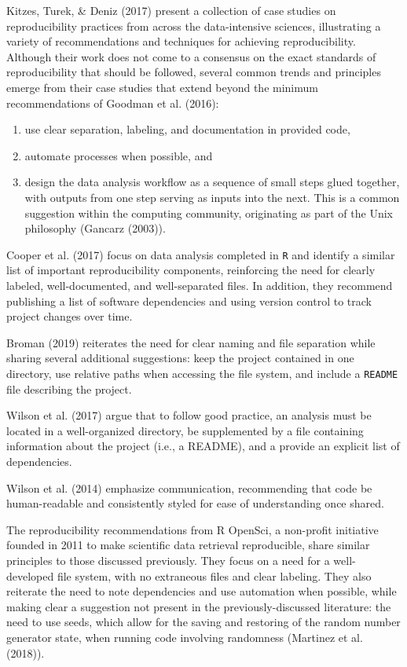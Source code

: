 \documentclass[12pt,twoside]{reedthesis}
\providecommand{\tightlist}{%
  \setlength{\itemsep}{0pt}\setlength{\parskip}{0pt}}
\begin{document}
Kitzes, Turek, \& Deniz (2017) present a collection of case studies on reproducibility practices from across the data-intensive sciences, illustrating a variety of recommendations and techniques for achieving reproducibility. Although their work does not come to a consensus on the exact standards of reproducibility that should be followed, several common trends and principles emerge from their case studies that extend beyond the minimum recommendations of Goodman et al. (2016):
\begin{enumerate}
\def\labelenumi{\arabic{enumi})}
\tightlist
\item
  use clear separation, labeling, and documentation in provided code,
\item
  automate processes when possible, and
\item
  design the data analysis workflow as a sequence of small steps glued together, with outputs from one step serving as inputs into the next. This is a common suggestion within the computing community, originating as part of the Unix philosophy (Gancarz (2003)).
\end{enumerate}
Cooper et al. (2017) focus on data analysis completed in \texttt{R} and identify a similar list of important reproducibility components, reinforcing the need for clearly labeled, well-documented, and well-separated files. In addition, they recommend publishing a list of software dependencies and using version control to track project changes over time.

Broman (2019) reiterates the need for clear naming and file separation while sharing several additional suggestions: keep the project contained in one directory, use relative paths when accessing the file system, and include a \texttt{README} file describing the project.

Wilson et al. (2017) argue that to follow good practice, an analysis must be located in a well-organized directory, be supplemented by a file containing information about the project (i.e., a README), and a provide an explicit list of dependencies.

Wilson et al. (2014) emphasize communication, recommending that code be human-readable and consistently styled for ease of understanding once shared.

The reproducibility recommendations from R OpenSci, a non-profit initiative founded in 2011 to make scientific data retrieval reproducible, share similar principles to those discussed previously. They focus on a need for a well-developed file system, with no extraneous files and clear labeling. They also reiterate the need to note dependencies and use automation when possible, while making clear a suggestion not present in the previously-discussed literature: the need to use seeds, which allow for the saving and restoring of the random number generator state, when running code involving randomness (Martinez et al. (2018)).
\end{document}
